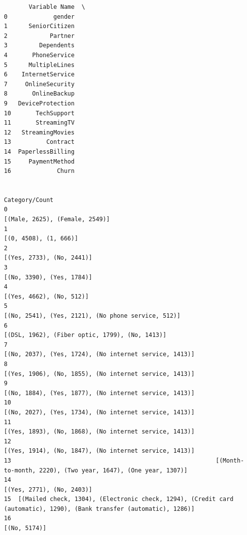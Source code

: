 \documentclass[8pt,onecolumn,aps,pra]{revtex4-1}
\begin{document}
    
    \begin{verbatim}
       Variable Name  \
0             gender   
1      SeniorCitizen   
2            Partner   
3         Dependents   
4       PhoneService   
5      MultipleLines   
6    InternetService   
7     OnlineSecurity   
8       OnlineBackup   
9   DeviceProtection   
10       TechSupport   
11       StreamingTV   
12   StreamingMovies   
13          Contract   
14  PaperlessBilling   
15     PaymentMethod   
16             Churn   

                                                                                                          Category/Count  
0                                                                                         [(Male, 2625), (Female, 2549)]  
1                                                                                                  [(0, 4508), (1, 666)]  
2                                                                                              [(Yes, 2733), (No, 2441)]  
3                                                                                              [(No, 3390), (Yes, 1784)]  
4                                                                                               [(Yes, 4662), (No, 512)]  
5                                                                     [(No, 2541), (Yes, 2121), (No phone service, 512)]  
6                                                                         [(DSL, 1962), (Fiber optic, 1799), (No, 1413)]  
7                                                                 [(No, 2037), (Yes, 1724), (No internet service, 1413)]  
8                                                                 [(Yes, 1906), (No, 1855), (No internet service, 1413)]  
9                                                                 [(No, 1884), (Yes, 1877), (No internet service, 1413)]  
10                                                                [(No, 2027), (Yes, 1734), (No internet service, 1413)]  
11                                                                [(Yes, 1893), (No, 1868), (No internet service, 1413)]  
12                                                                [(Yes, 1914), (No, 1847), (No internet service, 1413)]  
13                                                          [(Month-to-month, 2220), (Two year, 1647), (One year, 1307)]  
14                                                                                             [(Yes, 2771), (No, 2403)]  
15  [(Mailed check, 1304), (Electronic check, 1294), (Credit card (automatic), 1290), (Bank transfer (automatic), 1286)]  
16                                                                                                          [(No, 5174)]  
    \end{verbatim}
\end{document}

